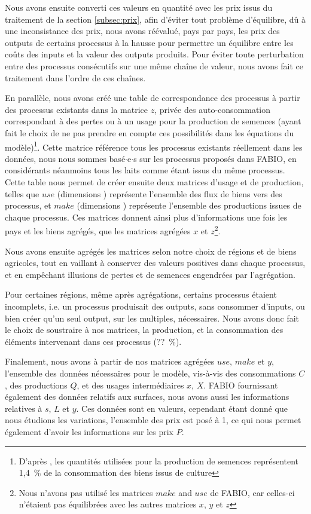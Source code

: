 Nous avons ensuite converti ces valeurs en quantité avec les prix issus du traitement de la section \ref{subsec:prix}, afin d'éviter tout problème d'équilibre, dû à une inconsistance des prix, nous avons réévalué, pays par pays, les prix des outputs de certains processus à la hausse pour permettre un équilibre entre les coûts des inputs et la valeur des outputs produits. Pour éviter toute perturbation entre des processus consécutifs sur une même chaîne de valeur, nous avons fait ce traitement dans l'ordre de ces chaînes.

En parallèle, nous avons créé une table de correspondance des processus à partir des processus existants dans la matrice $z$, privée des auto-consommation correspondant à des pertes ou à un usage pour la production de semences (ayant fait le choix de ne pas prendre en compte ces possibilités dans les équations du modèle)\footnote{D'après \cite{Bruckner2019}, les quantités utilisées pour la production de semences représentent 1,4~\% de la consommation des biens issus de culture}. Cette matrice référence tous les processus existants réellement dans les données, nous nous sommes basé$\cdot$e$\cdot$s sur les processus proposés dans FABIO, en considérants néanmoins tous les laits comme étant issus du même processus. Cette table nous permet de créer ensuite deux matrices d'usage et de production, telles que $use$ (dimensions ) représente l'ensemble des flux de biens vers des processus, et $make$ (dimensions ) représente l'ensemble des productions issues de chaque processus. Ces matrices donnent ainsi plus d'informations une fois les pays et les biens agrégés, que les matrices agrégées $x$ et $z$\footnote{Nous n'avons pas utilisé les matrices $make$ and $use$ de FABIO, car celles-ci n'étaient pas équilibrées avec les autres matrices $x$, $y$ et $z$}.

Nous avons ensuite agrégés les matrices selon notre choix de régions et de biens agricoles, tout en vaillant à conserver des valeurs positives dans chaque processus, et en empêchant illusions de pertes et de semences engendrées par l'agrégation.

Pour certaines régions, même après agrégations, certains processus étaient incomplets, i.e. un processus produisait des outputs, sans consommer d'inputs, ou bien créer qu'un seul output, sur les multiples, nécessaires. Nous avons donc fait le choix de soustraire à nos matrices, la production, et la consommation des éléments intervenant dans ces processus (??~\%).

Finalement, nous avons à partir de nos matrices agrégées $use$, $make$ et $y$, l'ensemble des données nécessaires pour le modèle, vis-à-vis des consommations $C$, des productions $Q$, et des usages intermédiaires $x$, $X$. FABIO fournissant également des données relatifs aux surfaces, nous avons aussi les informations relatives à $s$, $L$ et $y$. Ces données sont en valeurs, cependant étant donné que nous étudions les variations, l'ensemble des prix est posé à 1, ce qui nous permet également d'avoir les informations sur les prix $P$.

